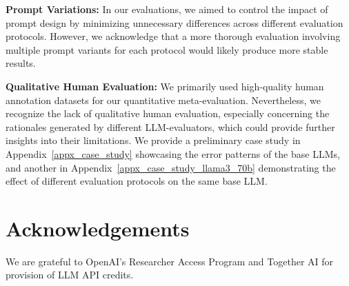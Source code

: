 \documentclass[11pt]{article}
\begin{document}
\noindent \textbf{Prompt Variations:} 
In our evaluations, we aimed to control the impact of prompt design by minimizing unnecessary differences across different evaluation protocols. 
However, we acknowledge that a more thorough evaluation involving multiple prompt variants for each protocol would likely produce more stable results.

\noindent \textbf{Qualitative Human Evaluation:} We primarily used high-quality human annotation datasets for our quantitative meta-evaluation. 
Nevertheless, we recognize the lack of qualitative human evaluation, especially concerning the rationales generated by different LLM-evaluators, which could provide further insights into their limitations.
We provide a preliminary case study in Appendix~\ref{appx_case_study} showcasing the error patterns of the base LLMs, and another in Appendix~\ref{appx_case_study_llama3_70b} demonstrating the effect of different evaluation protocols on the same base LLM.

\section*{Acknowledgements} 
We are grateful to OpenAI's Researcher Access Program and Together AI for provision of LLM API credits.


% 


\end{document}
